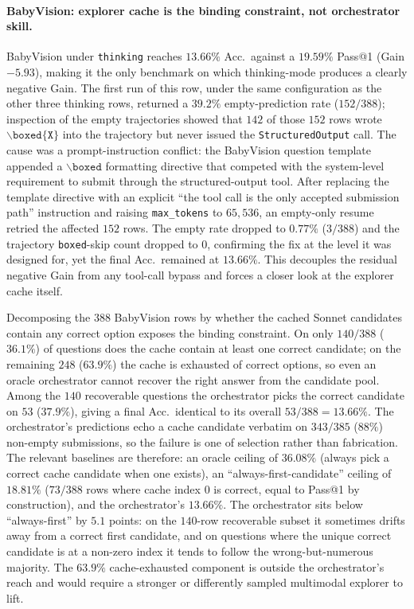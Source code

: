 \paragraph{BabyVision: explorer cache is the binding constraint, not orchestrator skill.} BabyVision under \texttt{thinking} reaches $13.66\%$ Acc.\ against a $19.59\%$ Pass@1 (Gain $-5.93$), making it the only benchmark on which thinking-mode produces a clearly negative Gain. The first run of this row, under the same configuration as the other three thinking rows, returned a $39.2\%$ empty-prediction rate ($152/388$); inspection of the empty trajectories showed that $142$ of those $152$ rows wrote $\backslash\texttt{boxed\{X\}}$ into the trajectory but never issued the \texttt{StructuredOutput} call. The cause was a prompt-instruction conflict: the BabyVision question template appended a $\backslash\texttt{boxed}$ formatting directive that competed with the system-level requirement to submit through the structured-output tool. After replacing the template directive with an explicit ``the tool call is the only accepted submission path'' instruction and raising \texttt{max\_tokens} to $65{,}536$, an empty-only resume retried the affected $152$ rows. The empty rate dropped to $0.77\%$ ($3/388$) and the trajectory \texttt{boxed}-skip count dropped to $0$, confirming the fix at the level it was designed for, yet the final Acc.\ remained at $13.66\%$. This decouples the residual negative Gain from any tool-call bypass and forces a closer look at the explorer cache itself.

Decomposing the $388$ BabyVision rows by whether the cached Sonnet candidates contain any correct option exposes the binding constraint. On only $140/388$ ($36.1\%$) of questions does the cache contain at least one correct candidate; on the remaining $248$ ($63.9\%$) the cache is exhausted of correct options, so even an oracle orchestrator cannot recover the right answer from the candidate pool. Among the $140$ recoverable questions the orchestrator picks the correct candidate on $53$ ($37.9\%$), giving a final Acc.\ identical to its overall $53/388 = 13.66\%$. The orchestrator's predictions echo a cache candidate verbatim on $343/385$ ($88\%$) non-empty submissions, so the failure is one of selection rather than fabrication. The relevant baselines are therefore: an oracle ceiling of $36.08\%$ (always pick a correct cache candidate when one exists), an ``always-first-candidate'' ceiling of $18.81\%$ ($73/388$ rows where cache index $0$ is correct, equal to Pass@1 by construction), and the orchestrator's $13.66\%$. The orchestrator sits below ``always-first'' by $5.1$ points: on the $140$-row recoverable subset it sometimes drifts away from a correct first candidate, and on questions where the unique correct candidate is at a non-zero index it tends to follow the wrong-but-numerous majority. The $63.9\%$ cache-exhausted component is outside the orchestrator's reach and would require a stronger or differently sampled multimodal explorer to lift.
